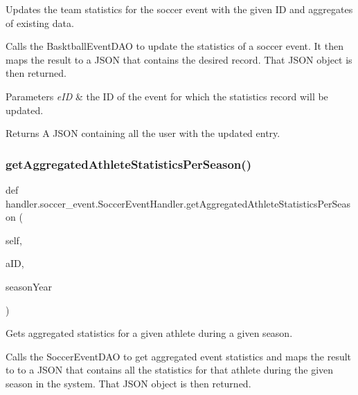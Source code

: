 Updates the team statistics for the soccer event with the given ID and aggregates of existing data. 

Calls the Basktball\+Event\+D\+AO to update the statistics of a soccer event. It then maps the result to a J\+S\+ON that contains the desired record. That J\+S\+ON object is then returned.


\begin{DoxyParams}{Parameters}
{\em e\+ID} & the ID of the event for which the statistics record will be updated.\\
\hline
\end{DoxyParams}
\begin{DoxyReturn}{Returns}
A J\+S\+ON containing all the user with the updated entry. 
\end{DoxyReturn}
\mbox{\label{classhandler_1_1soccer__event_1_1_soccer_event_handler_a2ee05e2424c68a714db390b907113205}} 
\subsubsection{\texorpdfstring{get\+Aggregated\+Athlete\+Statistics\+Per\+Season()}{getAggregatedAthleteStatisticsPerSeason()}}
{\footnotesize\ttfamily def handler.\+soccer\+\_\+event.\+Soccer\+Event\+Handler.\+get\+Aggregated\+Athlete\+Statistics\+Per\+Season (\begin{DoxyParamCaption}\item[{}]{self,  }\item[{}]{a\+ID,  }\item[{}]{season\+Year }\end{DoxyParamCaption})}



Gets aggregated statistics for a given athlete during a given season. 

Calls the Soccer\+Event\+D\+AO to get aggregated event statistics and maps the result to to a J\+S\+ON that contains all the statistics for that athlete during the given season in the system. That J\+S\+ON object is then returned.


